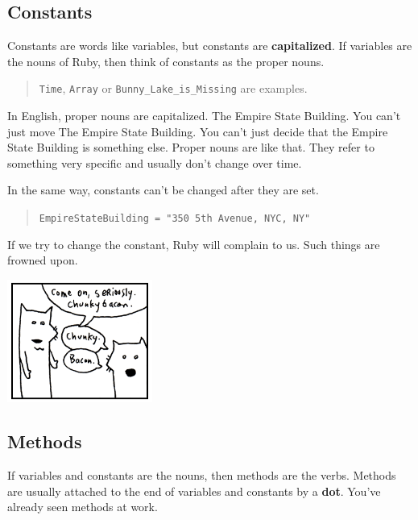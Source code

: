 \documentclass[10pt,twoside]{report}
\begin{document}
\subsection{Constants}



Constants are words like variables, but constants are {\bf
  capitalized}.  If variables are the nouns of Ruby, then think of
constants as the proper nouns.

\begin{quote}
\lstinline[breaklines=true]|Time|, \lstinline[breaklines=true]|Array|
or \lstinline[breaklines=true]|Bunny_Lake_is_Missing| are
examples.\end{quote}


In English, proper nouns are capitalized.  The Empire State Building.
You can't just move The Empire State Building.  You can't just decide
that the Empire State Building is something else. Proper nouns are
like that.  They refer to something very specific and usually don't
change over time.

In the same way, constants can't be changed after they are set.

\begin{quote}
\lstinline[breaklines=true]|EmpireStateBuilding = "350 5th Avenue, NYC, NY"|\end{quote}


If we try to change the constant, Ruby will complain to us.  Such
things are frowned upon.

	\includegraphics[width=0.3575\textwidth]{cache/11.png}




\subsection{Methods}



If variables and constants are the nouns, then methods are the
verbs. Methods are usually attached to the end of variables and
constants by a {\bf dot}.  You've already seen methods at work.
\end{document}
